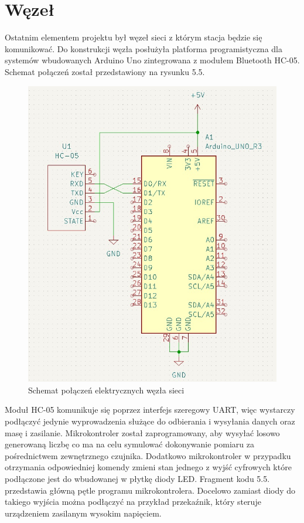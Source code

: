 \documentclass[12pt, twoside, openany]{mwrep}
\begin{document}
\section{Węzeł}
Ostatnim elementem projektu był węzeł sieci z którym stacja będzie się komunikować. Do konstrukcji węzła posłużyła platforma programistyczna dla systemów wbudowanych Arduino Uno zintegrowana z modułem Bluetooth HC-05. Schemat połączeń został przedstawiony na rysunku 5.5.

\begin{figure}[H]
\centering
\includegraphics[scale=0.8]{schemat}
\caption{Schemat połączeń elektrycznych węzła sieci}
\end{figure}
\par
Moduł HC-05 komunikuje się poprzez interfejs szeregowy UART, więc wystarczy podłączyć jedynie wyprowadzenia służące do odbierania i wysyłania danych oraz masę i zasilanie. Mikrokontroler został zaprogramowany, aby wysyłać losowo generowaną liczbę co ma na celu symulować dokonywanie pomiaru za pośrednictwem zewnętrznego czujnika. Dodatkowo mikrokontroler w przypadku otrzymania odpowiedniej komendy zmieni stan jednego z wyjść cyfrowych które podłączone jest do wbudowanej w płytkę diody LED. Fragment kodu 5.5. przedstawia główną pętle programu mikrokontrolera. Docelowo zamiast diody do takiego wyjścia można podłączyć na przykład przekaźnik, który steruje urządzeniem zasilanym wysokim napięciem.
\end{document}
